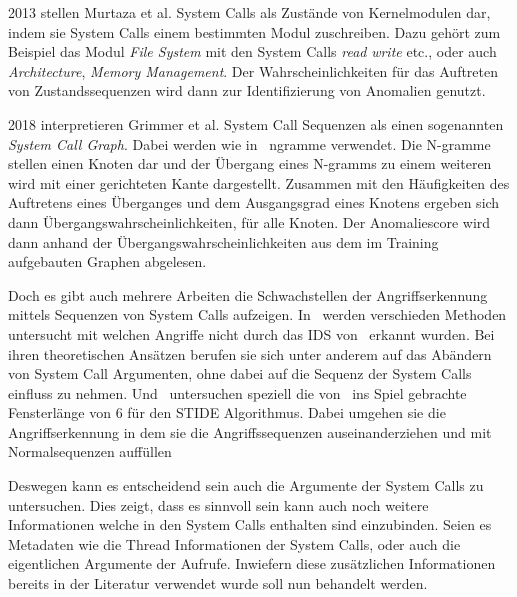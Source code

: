         2013 stellen Murtaza et al. System Calls als Zustände von Kernelmodulen dar, indem sie System Calls einem bestimmten Modul zuschreiben.
        Dazu gehört zum Beispiel das Modul \textit{File System} mit den System Calls \textit{read} \textit{write} etc., oder auch \textit{Architecture}, \textit{Memory Management}.
        Der Wahrscheinlichkeiten für das Auftreten von Zustandssequenzen wird dann zur Identifizierung von Anomalien genutzt.~\cite{SYSTEM_STATES}

        2018 interpretieren Grimmer et al. System Call Sequenzen als einen sogenannten \textit{System Call Graph}.
        Dabei werden wie in~\cite{STIDE_Alternatives} ngramme verwendet.
        Die N-gramme stellen einen Knoten dar und der Übergang eines N-gramms zu einem weiteren wird mit einer gerichteten Kante dargestellt.
        Zusammen mit den Häufigkeiten des Auftretens eines Überganges und dem Ausgangsgrad eines Knotens ergeben sich dann Übergangswahrscheinlichkeiten, für alle Knoten.
        Der Anomaliescore wird dann anhand der Übergangswahrscheinlichkeiten aus dem im Training aufgebauten Graphen abgelesen.~\cite{SYSCALL_GRAPHS} 


    Doch es gibt auch mehrere Arbeiten die Schwachstellen der Angriffserkennung mittels Sequenzen von System Calls aufzeigen.
    In~\cite{Syscallseqexploit1} werden verschieden Methoden untersucht mit welchen Angriffe nicht durch das IDS von~\cite{FORREST2000} erkannt wurden.
    Bei ihren theoretischen Ansätzen berufen sie sich unter anderem auf das Abändern von System Call Argumenten, ohne dabei auf die Sequenz der System Calls einfluss zu nehmen.
    Und~\cite{Syscallseqexploit3} untersuchen speziell die von~\cite{FORREST} ins Spiel gebrachte Fensterlänge von $6$ für den \ac{STIDE} Algorithmus.
    Dabei umgehen sie die Angriffserkennung in dem sie die Angriffssequenzen auseinanderziehen und mit Normalsequenzen auffüllen

    Deswegen kann es entscheidend sein auch die Argumente der System Calls zu untersuchen.
    Dies zeigt, dass es sinnvoll sein kann auch noch weitere Informationen welche in den System Calls enthalten sind einzubinden.
    Seien es Metadaten wie die Thread Informationen der System Calls, oder auch die eigentlichen Argumente der Aufrufe.
    Inwiefern diese zusätzlichen Informationen bereits in der Literatur verwendet wurde soll nun behandelt werden.

